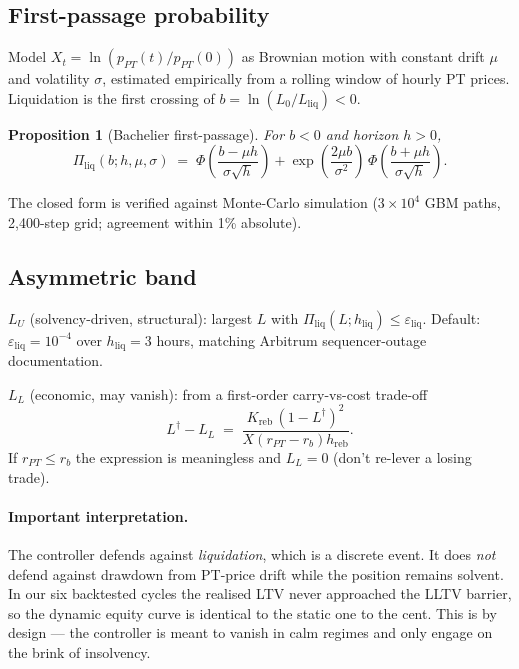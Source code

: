 \documentclass[11pt,a4paper]{article}
\newtheorem{proposition}{Proposition}
\begin{document}
\subsection{First-passage probability}

Model \(X_t = \ln(p_{PT}(t)/p_{PT}(0))\) as Brownian motion with
constant drift \(\mu\) and volatility \(\sigma\), estimated
empirically from a rolling window of hourly PT prices.
Liquidation is the first crossing of
\(b = \ln(L_0 / L_{\text{liq}}) < 0\).

\begin{proposition}[Bachelier first-passage]
\label{prop:fpt}
For \(b<0\) and horizon \(h>0\),
\begin{equation}
  \Pi_{\mathrm{liq}}(b; h, \mu, \sigma)
    \;=\;
    \Phi\!\left(\frac{b - \mu h}{\sigma \sqrt{h}}\right)
    + \exp\!\left(\frac{2\mu b}{\sigma^2}\right)\,
      \Phi\!\left(\frac{b + \mu h}{\sigma \sqrt{h}}\right).
  \label{eq:fpt}
\end{equation}
\end{proposition}

The closed form is verified against Monte-Carlo simulation
(\(3 \times 10^4\) GBM paths, 2{,}400-step grid; agreement within
1\% absolute).

\subsection{Asymmetric band}

\(L_U\) (solvency-driven, structural): largest \(L\) with
\(\Pi_{\mathrm{liq}}(L; h_{\mathrm{liq}}) \le \varepsilon_{\mathrm{liq}}\).
Default: \(\varepsilon_{\mathrm{liq}}=10^{-4}\) over
\(h_{\mathrm{liq}}=3\) hours, matching Arbitrum sequencer-outage
documentation.

\(L_L\) (economic, may vanish): from a first-order carry-vs-cost
trade-off
\begin{equation}
  L^\dagger - L_L
    \;=\;
    \frac{K_{\mathrm{reb}}\,(1-L^\dagger)^2}{X(r_{PT}-r_b)h_{\mathrm{reb}}}.
\end{equation}
If \(r_{PT} \le r_b\) the expression is meaningless and \(L_L = 0\)
(don't re-lever a losing trade).

\paragraph{Important interpretation.} The controller defends against
\emph{liquidation}, which is a discrete event. It does \emph{not}
defend against drawdown from PT-price drift while the position
remains solvent. In our six backtested cycles the realised LTV
never approached the LLTV barrier, so the dynamic equity curve is
identical to the static one to the cent. This is by design — the
controller is meant to vanish in calm regimes and only engage on
the brink of insolvency.
\end{document}
